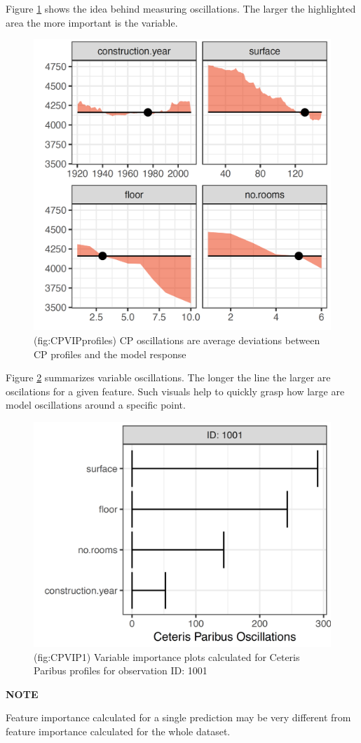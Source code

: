 \documentclass[]{krantz}
\theoremstyle{definition}
\theoremstyle{definition}
\theoremstyle{definition}
\theoremstyle{remark}
\begin{document}
Figure \ref{fig:CPVIPprofiles} shows the idea behind measuring
oscillations. The larger the highlighted area the more important is the
variable.

\begin{figure}

{\centering \includegraphics[width=0.5\linewidth]{figure/CP_VIP_profiles} 

}

\caption{(fig:CPVIPprofiles) CP oscillations are average deviations between CP profiles and the model response}\label{fig:CPVIPprofiles}
\end{figure}

Figure \ref{fig:CPVIP1} summarizes variable oscillations. The longer the
line the larger are oscilations for a given feature. Such visuals help
to quickly grasp how large are model oscillations around a specific
point.

\begin{figure}

{\centering \includegraphics[width=0.4\linewidth]{figure/cp_vip_1} 

}

\caption{(fig:CPVIP1) Variable importance plots calculated for Ceteris Paribus profiles for observation ID: 1001}\label{fig:CPVIP1}
\end{figure}

\textbf{NOTE}

Feature importance calculated for a single prediction may be very
different from feature importance calculated for the whole dataset.
\end{document}
